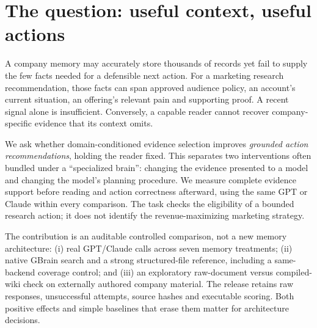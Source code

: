 \section{The question: useful context, useful actions}
A company memory may accurately store thousands of records yet fail to supply the few facts needed for a defensible next action. For a marketing research recommendation, those facts can span approved audience policy, an account's current situation, an offering's relevant pain and supporting proof. A recent signal alone is insufficient. Conversely, a capable reader cannot recover company-specific evidence that its context omits.

We ask whether domain-conditioned evidence selection improves \emph{grounded action recommendations}, holding the reader fixed. This separates two interventions often bundled under a ``specialized brain'': changing the evidence presented to a model and changing the model's planning procedure. We measure complete evidence support before reading and action correctness afterward, using the same GPT or Claude within every comparison. The task checks the eligibility of a bounded research action; it does not identify the revenue-maximizing marketing strategy.

The contribution is an auditable controlled comparison, not a new memory architecture: (i) real GPT/Claude calls across seven memory treatments; (ii) native GBrain search and a strong structured-file reference, including a same-backend coverage control; and (iii) an exploratory raw-document versus compiled-wiki check on externally authored company material. The release retains raw responses, unsuccessful attempts, source hashes and executable scoring. Both positive effects and simple baselines that erase them matter for architecture decisions.
